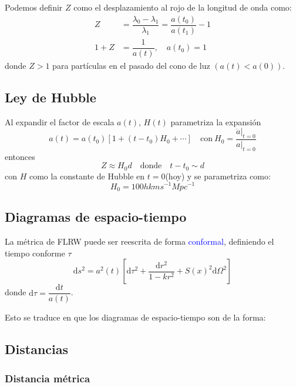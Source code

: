 \documentclass[../main]{subfiles}
\begin{document}
Podemos definir $Z$ como el desplazamiento al rojo de la longitud de onda como:
\begin{equation}
    \begin{split}
        Z&=\dfrac{\lambda_0-\lambda_1}{\lambda_1}=\dfrac{a(t_0)}{a(t_1)}-1\\
        1+Z&=\dfrac{1}{a(t)},\quad a(t_0)=1
    \end{split}
\end{equation}
donde $Z>1$ para partículas en el pasado del cono de luz $(a(t)<a(0))$.

\subsection{Ley de Hubble}

Al expandir el factor de escala $a(t)$, $H(t)$ parametriza la expansión
\begin{equation}
    a(t)=a(t_0)\left[1+(t-t_0)H_0+\cdots\right] \quad \text{con} \ H_0=\dfrac{\dot{a} |_{t=0}}{a|_{t=0}}
\end{equation}
entonces 
\begin{equation}
    Z \approx H_0 d \quad \text{donde} \quad t-t_0 \sim d
\end{equation}
con $H$ como la constante de Hubble en $t=0$(hoy) y se parametriza como:
\begin{equation}
    H_0=100 h km s^{-1} Mpc^{-1}
\end{equation}

\subsection{Diagramas de espacio-tiempo}

La métrica de FLRW puede ser reescrita de forma \textcolor{blue}{conformal}, definiendo el tiempo conforme $\tau$
\begin{equation}
    \mathrm{d}s^2=a^2(t)\left[\mathrm{d}\tau^2+\dfrac{\mathrm{d}r^2}{1-kr^2}+S(x)^2\mathrm{d}\Omega^2\right]
\end{equation}
donde $\mathrm{d}\tau=\dfrac{\mathrm{d}t}{a(t)}$.

Esto se traduce en que los diagramas de espacio-tiempo son de la forma:

\subsection{Distancias}

\subsubsection{Distancia métrica}
\end{document}
